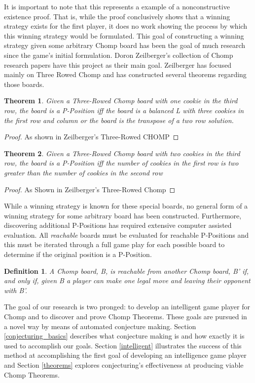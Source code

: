 \documentclass{amsart}
\newtheorem{thm}{Theorem}
\newtheorem{term}{Definition} %
\theoremstyle{definition}
\theoremstyle{remark}
\numberwithin{equation}{section}
\begin{document}
It is important to note that this represents a example of a nonconstructive existence proof. That is, while the proof conclusively shows that a winning strategy exists for the first player, it does no work showing the process by which this winning strategy would be formulated. This goal of constructing a winning strategy given some arbitrary Chomp board has been the goal of much research since the game's initial formulation. Doron Zeilberger's collection of Chomp research papers have this project as their main goal. Zeilberger has focused mainly on Three Rowed Chomp and has constructed several theorems regarding those boards.

\begin{thm}
\label{3row1inthirdrow}
Given a Three-Rowed Chomp board with one cookie in the third row, the board is a P-Position iff the board is a balanced L with three cookies in the first row and column or the board is the transpose of a two row solution.
\end{thm}
\begin{proof}
As shown in Zeilberger's Three-Rowed CHOMP\cite{zeilberger}
\end{proof}

\begin{thm}
\label{3row2inthirdrow}
Given a Three-Rowed Chomp board with two cookies in the third row, the board is a P-Position iff the number of cookies in the first row is two greater than the number of cookies in the second row
\end{thm}
\begin{proof}
As Shown in Zeilberger's Three-Rowed Chomp\cite{zeilberger}
\end{proof}



While a winning strategy is known for these special boards, no general form of a winning strategy for some arbitrary board has been constructed. Furthermore, discovering additional P-Positions has required extensive computer assisted evaluation. All \textit{reachable} boards must be evaluated for reachable P-Positions and this must be iterated through a full game play for each possible board to determine if the original position is a P-Position.


\begin{term} A Chomp board, B, is reachable from another Chomp board, B' if, and only if, given B a player can make one legal move and leaving their opponent with B'.
\end{term}

The goal of our research is two pronged: to develop an intelligent game player for Chomp and to discover and prove Chomp Theorems. These goals are pursued in a novel way by means of automated conjecture making. Section \ref{conjecturing_basics} describes what conjecture making is and how exactly it is used to accomplish our goals. Section \ref{intelligent} illustrates the success of this method at accomplishing the first goal of developing an intelligence game player and Section \ref{theorems} explores conjecturing's effectiveness at producing viable Chomp Theorems.
  
\end{document}

